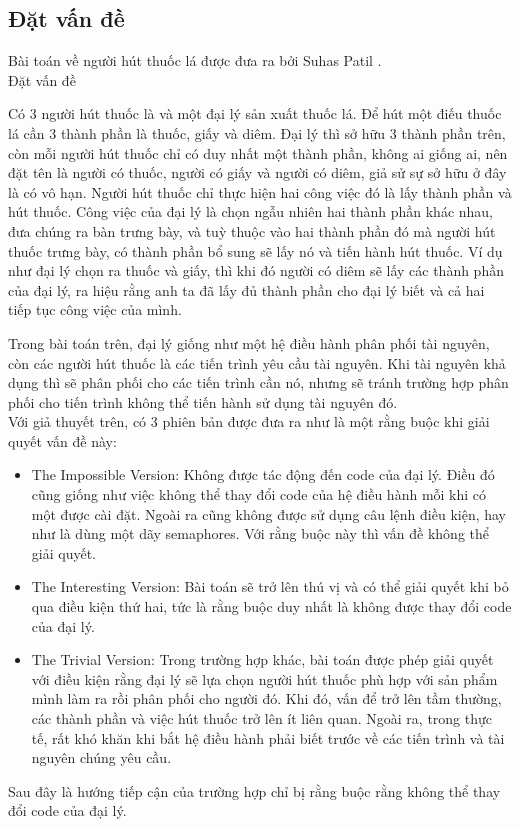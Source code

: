 \documentclass[a4paper]{article}
\begin{document}
	\subsection{Đặt vấn đề}
	Bài toán về người hút thuốc lá được đưa ra bởi Suhas Patil \cite{r2}.\\[0.5cm]
	\large{Đặt vấn đề}
	\begin{tcolorbox}
		Có 3 người hút thuốc là và một đại lý sản xuất thuốc lá. Để hút một điếu thuốc lá cần 3 thành 
		phần là thuốc, giấy và diêm. Đại lý thì sở hữu 3 thành phần trên, còn mỗi người hút thuốc
		chỉ có duy nhất một thành phần, không ai giống ai, nên đặt tên là người có thuốc, người có giấy
		và người có diêm, giả sử sự sở hữu ở đây là có vô hạn. Người hút thuốc chỉ thực hiện hai công
		việc đó là lấy thành phần và hút thuốc. Công việc của đại lý là chọn ngẫu nhiên hai thành phần 
		khác nhau, đưa chúng ra bàn trưng bày, và tuỳ thuộc vào hai thành phần đó mà người hút thuốc trưng bày,
		có thành phần bổ sung sẽ lấy nó
		và tiến hành hút thuốc. Ví dụ như đại lý chọn ra thuốc và giấy, thì khi đó người có diêm sẽ lấy 
		các thành phần của đại lý, ra hiệu rằng anh ta đã lấy đủ thành phần cho đại lý biết và cả hai tiếp
		tục công việc của mình.
	\end{tcolorbox}
	Trong bài toán trên, đại lý giống như một hệ điều hành phân phối tài nguyên, còn các người hút thuốc
	là các tiến trình yêu cầu tài nguyên. Khi tài nguyên khả dụng thì sẽ phân phối cho các tiến trình cần
	nó, nhưng sẽ tránh trường hợp phân phối cho tiến trình không thể tiến hành sử dụng tài nguyên đó. \\
	Với giả thuyết trên, có 3 phiên bản được đưa ra như là một rằng buộc khi giải quyết vấn đề này:
	\begin{itemize}
		\item \large{The Impossible Version:} Không được tác động đến code của đại lý. Điều đó cũng 
		giống như việc không thể thay đổi code của hệ điều hành mỗi khi có một được cài đặt. Ngoài ra
		cũng không được sử dụng câu lệnh điều kiện, hay như là dùng một dãy semaphores.  
		Với rằng buộc này thì vấn đề không thể giải quyết. 
		\item \large{The Interesting Version:} Bài toán sẽ trở lên thú vị và có thể giải quyết khi
		bỏ qua điều kiện thứ hai, tức là rằng buộc duy nhất là không được thay đổi code của đại lý.
		\item \large{The Trivial Version:} Trong trường hợp khác, bài toán được phép giải quyết với
		điều kiện rằng đại lý sẽ lựa chọn người hút thuốc phù hợp với sản phẩm mình làm ra rồi phân 
		phối cho người đó. Khi đó, vấn để trở lên tầm thường, các thành phần và việc hút thuốc trở 
		lên ít liên quan. Ngoài ra, trong thực tế, rất khó khăn khi bắt hệ điều hành phải biết trước
		về các tiến trình và tài nguyên chúng yêu cầu. 
	\end{itemize}
	Sau đây là hướng tiếp cận của trường hợp chỉ bị rằng buộc rằng không thể thay đổi code của đại lý.
\end{document}
